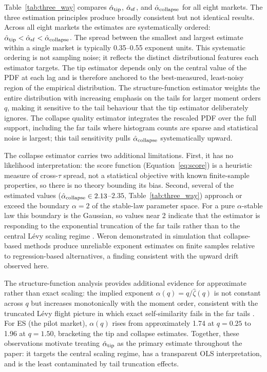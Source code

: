 \documentclass[12pt,a4paper]{article}
\begin{document}
Table~\ref{tab:three_way} compares $\hat{\alpha}_{\mathrm{tip}}$,
$\hat{\alpha}_{\mathrm{sf}}$, and $\hat{\alpha}_{\mathrm{collapse}}$ for all eight markets.
The three estimation principles produce broadly consistent but not identical
results.
Across all eight markets the estimates are systematically ordered:
$\hat{\alpha}_{\mathrm{tip}} < \hat{\alpha}_{\mathrm{sf}} < \hat{\alpha}_{\mathrm{collapse}}$.
The spread between the smallest and largest estimate within a single market is
typically 0.35--0.55 exponent units.
This systematic ordering is not sampling noise; it reflects the distinct
distributional features each estimator targets.
The tip estimator depends only on the central value of the PDF at each lag
and is therefore anchored to the best-measured, least-noisy region of the
empirical distribution.
The structure-function estimator weights the entire distribution with
increasing emphasis on the tails for larger moment orders $q$, making it
sensitive to the tail behaviour that the tip estimator deliberately ignores.
The collapse quality estimator integrates the rescaled PDF over the full
support, including the far tails where histogram counts are sparse and
statistical noise is largest; this tail sensitivity pulls
$\hat{\alpha}_{\mathrm{collapse}}$ systematically upward.

The collapse estimator carries two additional limitations.
First, it has no likelihood interpretation: the score function
(Equation~\eqref{eq:score}) is a heuristic measure of
cross-$\tau$ spread, not a statistical objective with known finite-sample
properties, so there is no theory bounding its bias.
Second, several of the estimated values ($\hat{\alpha}_{\mathrm{collapse}}
\in 2.13$--$2.35$, Table~\ref{tab:three_way}) approach or exceed the
boundary $\alpha=2$ of the stable-law parameter space.
For a pure $\alpha$-stable law this boundary is the Gaussian, so values
near 2 indicate that the estimator is responding to the exponential
truncation of the far tails rather than to the central Lévy scaling
regime \cite{MantegnaStanley1994,Weron2001}.
Weron \cite{Weron2001} demonstrated in simulation that collapse-based
methods produce unreliable exponent estimates on finite samples relative
to regression-based alternatives, a finding consistent with the upward
drift observed here.

The structure-function analysis provides additional evidence for approximate
rather than exact scaling: the implied exponent $\alpha(q) = q/\hat\zeta(q)$
is not constant across $q$ but increases monotonically with the moment
order, consistent with the truncated Lévy flight picture in which exact
self-similarity fails in the far tails \cite{MantegnaStanley1994,MantegnaStanley1995}.
For ES (the pilot market), $\alpha(q)$ rises from approximately 1.74 at $q=0.25$
to 1.96 at $q=1.50$, bracketing the tip and collapse estimates.
Together, these observations motivate treating $\hat{\alpha}_{\mathrm{tip}}$ as
the primary estimate throughout the paper: it targets the central scaling
regime, has a transparent OLS interpretation, and is the least contaminated
by tail truncation effects.
\end{document}
